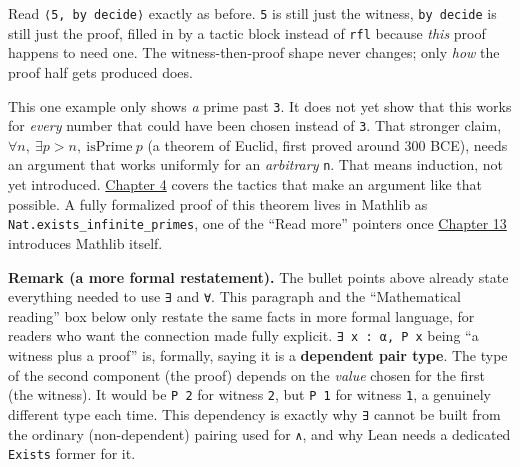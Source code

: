 Read \texttt{⟨5, by decide⟩} exactly as before. \texttt{5} is still just the witness, \texttt{by decide} is still just the proof, filled in by a tactic block instead of \texttt{rfl} because \emph{this} proof happens to need one. The witness-then-proof shape never changes; only \emph{how} the proof half gets produced does.

This one example only shows \emph{a} prime past \texttt{3}. It does not yet show that this works for \emph{every} number that could have been chosen instead of \texttt{3}. That stronger claim, \(\forall n,\ \exists p > n,\ \mathrm{isPrime}\ p\) (a theorem of Euclid, first proved around 300 BCE), needs an argument that works uniformly for an \emph{arbitrary} \texttt{n}. That means induction, not yet introduced. \hyperref[sec:04-tactics:00-index:1]{Chapter 4} covers the tactics that make an argument like that possible. A fully formalized proof of this theorem lives in Mathlib as \texttt{Nat.exists\_\allowbreak{}infinite\_\allowbreak{}primes}, one of the ``Read more'' pointers once \hyperref[sec:13-next-steps:00-index:1]{Chapter 13} introduces Mathlib itself.

\textbf{Remark (a more formal restatement).} The bullet points above already state everything needed to use \texttt{∃} and \texttt{∀}. This paragraph and the ``Mathematical reading'' box below only restate the same facts in more formal language, for readers who want the connection made fully explicit. \texttt{∃ x : α, P x} being ``a witness plus a proof'' is, formally, saying it is a \textbf{dependent pair type}. The type of the second component (the proof) depends on the \emph{value} chosen for the first (the witness). It would be \texttt{P 2} for witness \texttt{2}, but \texttt{P 1} for witness \texttt{1}, a genuinely different type each time. This dependency is exactly why \texttt{∃} cannot be built from the ordinary (non-dependent) pairing used for \texttt{∧}, and why Lean needs a dedicated \texttt{Exists} former for it.


